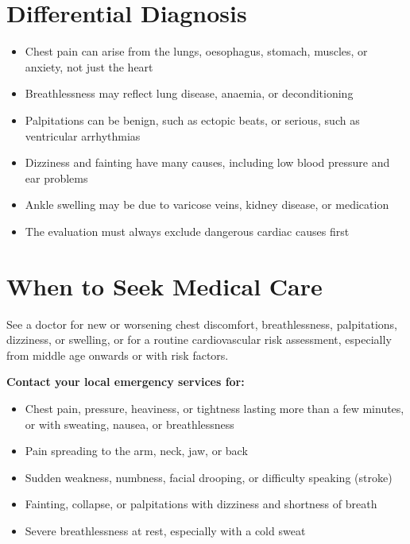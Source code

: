 \section*{Differential Diagnosis}
\begin{itemize}
    \item Chest pain can arise from the lungs, oesophagus, stomach, muscles, or anxiety, not just the heart
    \item Breathlessness may reflect lung disease, anaemia, or deconditioning
    \item Palpitations can be benign, such as ectopic beats, or serious, such as ventricular arrhythmias
    \item Dizziness and fainting have many causes, including low blood pressure and ear problems
    \item Ankle swelling may be due to varicose veins, kidney disease, or medication
    \item The evaluation must always exclude dangerous cardiac causes first
\end{itemize}

\section*{When to Seek Medical Care}
See a doctor for new or worsening chest discomfort, breathlessness, palpitations, dizziness, or swelling, or for a routine cardiovascular risk assessment, especially from middle age onwards or with risk factors.

\textbf{Contact your local emergency services for:}
\begin{itemize}
    \item Chest pain, pressure, heaviness, or tightness lasting more than a few minutes, or with sweating, nausea, or breathlessness
    \item Pain spreading to the arm, neck, jaw, or back
    \item Sudden weakness, numbness, facial drooping, or difficulty speaking (stroke)
    \item Fainting, collapse, or palpitations with dizziness and shortness of breath
    \item Severe breathlessness at rest, especially with a cold sweat
\end{itemize}

